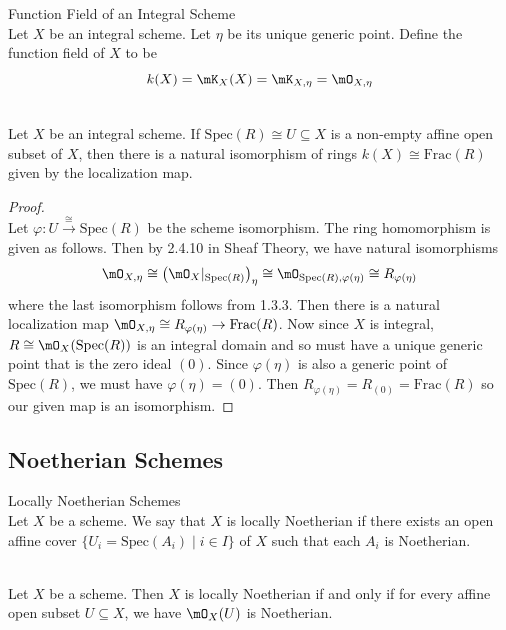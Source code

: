 \documentclass[a4paper]{article}
\begin{document}
\begin{defn}{Function Field of an Integral Scheme}{}\\
Let $X$ be an integral scheme. Let $\eta$ be its unique generic point. Define the function field of $X$ to be $$k(X)=\mK_X(X)=\mK_{X,\eta}=\mO_{X,\eta}$$
\end{defn}

\begin{lmm}{}{}\\
Let $X$ be an integral scheme. If $\text{Spec}(R)\cong U\subseteq X$ is a non-empty affine open subset of $X$, then there is a natural isomorphism of rings $k(X)\cong\text{Frac}(R)$ given by the localization map. 
\begin{proof}\\
Let $\varphi:U\overset{\cong}{\to}\text{Spec}(R)$ be the scheme isomorphism. The ring homomorphism is given as follows. Then by 2.4.10 in Sheaf Theory, we have natural isomorphisms $$\mO_{X,\eta}\cong\left(\mO_X|_{\text{Spec}(R)}\right)_\eta\cong\mO_{\text{Spec}(R),\varphi(\eta)}\cong R_{\varphi(\eta)}$$ where the last isomorphism follows from 1.3.3. Then there is a natural localization map $\mO_{X,\eta}\cong R_{\varphi(\eta)}\to\text{Frac}(R)$. Now since $X$ is integral, $R\cong\mO_X(\text{Spec}(R))$ is an integral domain and so must have a unique generic point that is the zero ideal $(0)$. Since $\varphi(\eta)$ is also a generic point of $\text{Spec}(R)$, we must have $\varphi(\eta)=(0)$. Then $R_{\varphi(\eta)}=R_{(0)}=\text{Frac}(R)$ so our given map is an isomorphism. 
\end{proof}
\end{lmm}

\subsection{Noetherian Schemes}
\begin{defn}{Locally Noetherian Schemes}{}\\
Let $X$ be a scheme. We say that $X$ is locally Noetherian if there exists an open affine cover $\{U_i=\text{Spec}(A_i)\;|\;i\in I\}$ of $X$ such that each $A_i$ is Noetherian. 
\end{defn}

\begin{prp}{}{}\\
Let $X$ be a scheme. Then $X$ is locally Noetherian if and only if for every affine open subset $U\subseteq X$, we have $\mO_X(U)$ is Noetherian. 
\end{prp}
\end{document}
